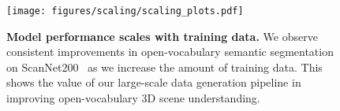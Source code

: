 \begin{figure}[t]
    \centering
    \texttt{[image: figures/scaling/scaling\_plots.pdf]}
    \vspace{-2mm}
    \caption{
        \textbf{Model performance scales with training data.}
        We observe consistent improvements in open-vocabulary semantic segmentation on ScanNet200~\cite{scannet200} as we increase the amount of training data.
        This shows the value of our large-scale data generation pipeline in improving open-vocabulary 3D scene understanding.
    }
    \label{fig:scaling}
\end{figure}

